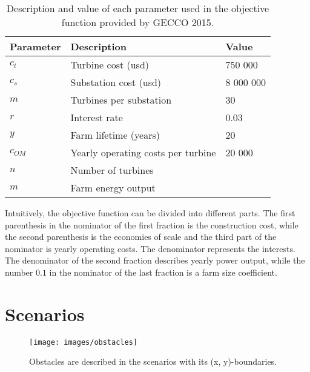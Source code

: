 \begin{table}[h!]
\begin{center}
\caption{Description and value of each parameter used in the objective function provided by GECCO 2015.}
\label{Parameters}
\begin{tabular}{l|l|l}
\textbf{Parameter} & \textbf{Description} & \textbf{Value} \\ 
\hline 
$c_t$ & Turbine cost (usd) & 750 000 \\ 
$c_s$ & Substation cost (usd) & 8 000 000 \\ 
$m$ & Turbines per substation & 30 \\ 
$r$ & Interest rate & 0.03 \\ 
$y$ & Farm lifetime (years) & 20 \\ 
$c_{OM}$ & Yearly operating costs per turbine & 20 000 \\ 
$n$ & Number of turbines &  \\ 
$m$ & Farm energy output &  \\  
\end{tabular} 
\end{center}
\end{table}


\noindent Intuitively, the objective function can be divided into different parts. The first parenthesis in the nominator of the first fraction is the construction cost, while the second parenthesis is the economies of scale and the third part of the nominator is yearly operating costs. The denominator represents the interests. The denominator of the second fraction describes yearly power output, while the number $0.1$ in the nominator of the last fraction is a farm size coefficient. \\


\section{Scenarios}\label{section:scenarios}


\begin{figure}[h!]
\begin{center}
\texttt{[image: images/obstacles]}
\caption{Obstacles are described in the scenarios with its (x, y)-boundaries.}
\label{figure:obstacles}
\end{center}
\end{figure}


